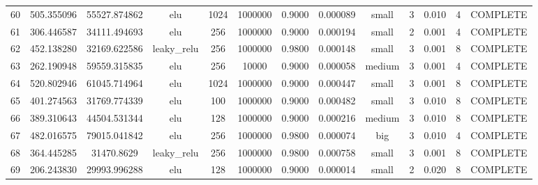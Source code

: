 \begin{longtable}{ccccccccccccc}
                       60 &                 505.355096 &                       55527.874862 &             elu &        1024 &      1000000 & 0.9000 &       0.000089 &     small &             3 & 0.010 &           4 & COMPLETE \\
                       61 &                 306.446587 &                       34111.494693 &             elu &         256 &      1000000 & 0.9000 &       0.000194 &     small &             2 & 0.001 &           4 & COMPLETE \\
                       62 &                 452.138280 &                       32169.622586 &     leaky\_relu &         256 &      1000000 & 0.9800 &       0.000148 &     small &             3 & 0.001 &           8 & COMPLETE \\
                       63 &                 262.190948 &                       59559.315835 &             elu &         256 &        10000 & 0.9000 &       0.000058 &    medium &             3 & 0.001 &           4 & COMPLETE \\
                       64 &                 520.802946 &                       61045.714964 &             elu &        1024 &      1000000 & 0.9000 &       0.000447 &     small &             3 & 0.001 &           8 & COMPLETE \\
                       65 &                 401.274563 &                       31769.774339 &             elu &         100 &      1000000 & 0.9000 &       0.000482 &     small &             3 & 0.010 &           8 & COMPLETE \\
                       66 &                 389.310643 &                       44504.531344 &             elu &         128 &      1000000 & 0.9000 &       0.000216 &    medium &             3 & 0.010 &           8 & COMPLETE \\
                       67 &                 482.016575 &                       79015.041842 &             elu &         256 &      1000000 & 0.9800 &       0.000074 &       big &             3 & 0.010 &           4 & COMPLETE \\
                       68 &                 364.445285 &                         31470.8629 &     leaky\_relu &         256 &      1000000 & 0.9800 &       0.000758 &     small &             3 & 0.001 &           8 & COMPLETE \\
                       69 &                 206.243830 &                       29993.996288 &             elu &         128 &      1000000 & 0.9000 &       0.000014 &     small &             2 & 0.020 &           8 & COMPLETE \\

\end{longtable}
